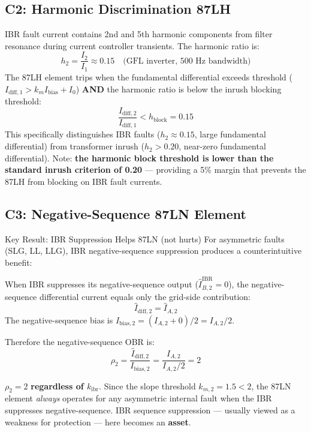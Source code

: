\documentclass[12pt,a4paper]{article}
\newcommand{\kibr}{k_\mathrm{ibr}}
\newcommand{\Ibias}{I_\mathrm{bias}}
\newcommand{\km}{k_m}
\begin{document}
\subsection{C2: Harmonic Discrimination 87LH}

IBR fault current contains 2nd and 5th harmonic components from filter resonance during current controller transients. The harmonic ratio is:
\begin{equation}
  h_2 = \frac{I_2}{I_1} \approx 0.15 \quad \text{(GFL inverter, 500~Hz bandwidth)}
  \label{eq:h2}
\end{equation}
The 87LH element trips when the fundamental differential exceeds threshold ($I_{\mathrm{diff},1} > \km \Ibias + I_0$) \textbf{AND} the harmonic ratio is below the inrush blocking threshold:
\begin{equation}
  \frac{I_{\mathrm{diff},2}}{I_{\mathrm{diff},1}} < h_\mathrm{block} = 0.15
  \label{eq:87lh}
\end{equation}
This specifically distinguishes IBR faults ($h_2 \approx 0.15$, large fundamental differential) from transformer inrush ($h_2 > 0.20$, near-zero fundamental differential). Note: \textbf{the harmonic block threshold is lower than the standard inrush criterion of 0.20} --- providing a 5\% margin that prevents the 87LH from blocking on IBR fault currents.

\subsection{C3: Negative-Sequence 87LN Element}

\begin{resultbox}{Key Result: IBR Suppression Helps 87LN (not hurts)}
For asymmetric faults (SLG, LL, LLG), IBR negative-sequence suppression produces a counterintuitive benefit:

When IBR suppresses its negative-sequence output ($\hat{I}_{B,2}^\mathrm{IBR} = 0$), the negative-sequence differential current equals only the grid-side contribution:
\[
  \hat{I}_{\mathrm{diff},2} = \hat{I}_{A,2}
\]
The negative-sequence bias is $I_{\mathrm{bias},2} = (I_{A,2} + 0)/2 = I_{A,2}/2$.

Therefore the negative-sequence OBR is:
\begin{equation}
  \rho_2 = \frac{\hat{I}_{\mathrm{diff},2}}{I_{\mathrm{bias},2}} = \frac{I_{A,2}}{I_{A,2}/2} = 2
  \label{eq:rho2}
\end{equation}

$\rho_2 = 2$ \textbf{regardless of $\kibr$}. Since the slope threshold $k_{m,2} = 1.5 < 2$, the 87LN element \textit{always} operates for any asymmetric internal fault when the IBR suppresses negative-sequence. IBR sequence suppression --- usually viewed as a weakness for protection --- here becomes an \textbf{asset}.
\end{resultbox}
\end{document}

